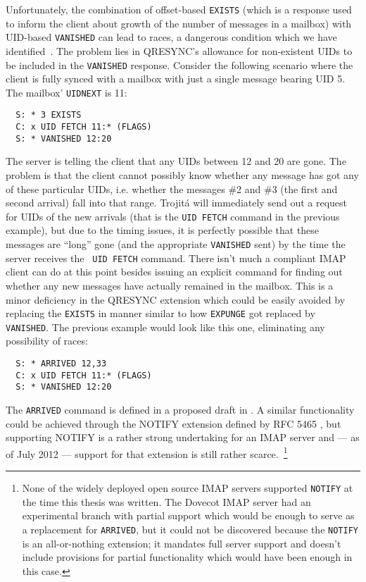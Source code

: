 \documentclass[trojita]{subfiles}
\begin{document}
Unfortunately, the combination of offset-based {\tt EXISTS} (which is a response used to inform the client about growth
of the number of messages in a mailbox) with UID-based {\tt VANISHED} can lead to races, a dangerous condition which we
have identified~\cite{kundrat-vanished-race}.  The problem lies in QRESYNC's allowance for non-existent UIDs to be
included in the {\tt VANISHED} response.  Consider the following scenario where the client is fully synced with a
mailbox with just a single message bearing UID 5.  The mailbox' {\tt UIDNEXT} is 11:

\begin{verbatim}
  S: * 3 EXISTS
  C: x UID FETCH 11:* (FLAGS)
  S: * VANISHED 12:20
\end{verbatim}

The server is telling the client that any UIDs between 12 and 20 are gone.  The problem is that the client cannot
possibly know whether any message has got any of these particular UIDs, i.e. whether the messages \#2 and \#3 (the first
and second arrival) fall into that range.  Trojitá will immediately send out a request for UIDs of the new arrivals
(that is the {\tt UID FETCH} command in the previous example), but due to the timing issues, it is perfectly possible
that these messages are ``long'' gone (and the appropriate {\tt VANISHED} sent) by the time the server receives the {\tt
UID FETCH} command.  There isn't much a compliant IMAP client can do at this point besides issuing an explicit command
for finding out whether any new messages have actually remained in the mailbox.  This is a minor deficiency in the
QRESYNC extension which could be easily avoided by replacing the {\tt EXISTS} in manner similar to how {\tt EXPUNGE} got
replaced by {\tt VANISHED}.  The previous example would look like this one, eliminating any possibility of races:

\begin{verbatim}
  S: * ARRIVED 12,33
  C: x UID FETCH 11:* (FLAGS)
  S: * VANISHED 12:20
\end{verbatim}

The {\tt ARRIVED} command is defined in a proposed draft in .  A similar functionality could
be achieved through the NOTIFY extension defined by RFC 5465 \cite{rfc5465}, but supporting NOTIFY is a rather strong
undertaking for an IMAP server and --- as of July 2012 --- support for that extension is still rather
scarce.~\footnote{None of the widely deployed open source IMAP servers supported {\tt NOTIFY} at the time this thesis
was written.  The Dovecot IMAP server had an experimental branch with partial support which would be enough to serve as
a replacement for {\tt ARRIVED}, but it could not be discovered because the {\tt NOTIFY} is an all-or-nothing extension;
it mandates full server support and doesn't include provisions for partial functionality which would have been enough in
this case.}
\end{document}
